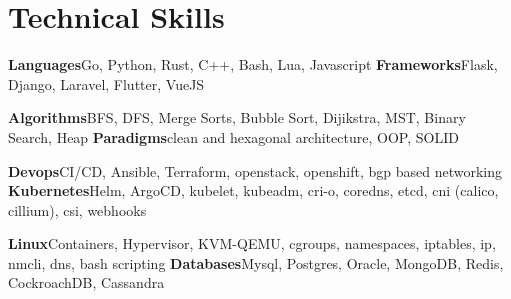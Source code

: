 \section{Technical Skills}

\cvdoubleitem
  {\textbf{Languages}}{Go, Python, Rust, C++, Bash, Lua, Javascript}
  {\textbf{Frameworks}}{Flask, Django, Laravel, Flutter, VueJS}

\cvdoubleitem
  {\textbf{Algorithms}}{BFS, DFS, Merge Sorts, Bubble Sort, Dijikstra, MST, Binary Search, Heap}
  {\textbf{Paradigms}}{clean and hexagonal architecture, OOP, SOLID}

\cvdoubleitem
  {\textbf{Devops}}{CI/CD, Ansible, Terraform, openstack, openshift, bgp based networking}
  {\textbf{Kubernetes}}{Helm, ArgoCD, kubelet, kubeadm, cri-o, coredns, etcd, cni (calico, cillium), csi, webhooks}

\cvdoubleitem
  {\textbf{Linux}}{Containers, Hypervisor, KVM-QEMU, cgroups, namespaces, iptables, ip, nmcli, dns, bash scripting}
  {\textbf{Databases}}{Mysql, Postgres, Oracle, MongoDB, Redis, CockroachDB, Cassandra}
